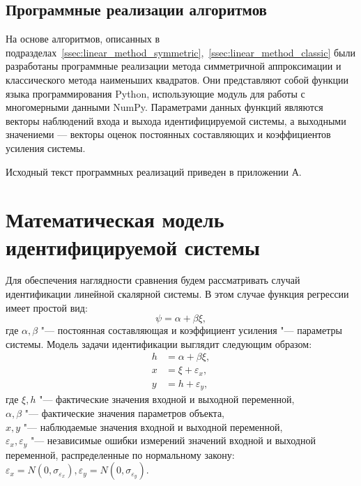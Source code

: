 \vspace{2\baselineskip}
\subsection{Программные реализации алгоритмов}

На основе алгоритмов, описанных в
подразделах~\ref{ssec:linear_method_symmetric},~\ref{ssec:linear_method_classic}
были разработаны программные реализации метода симметричной аппроксимации и
классического метода наименьших квадратов.
Они представляют собой функции языка программирования Python,
использующие модуль для работы с многомерными данными NumPy.
Параметрами данных функций являются векторы наблюдений входа и выхода
идентифицируемой системы, а выходными значениеми ---
векторы оценок постоянных составляющих и коэффициентов усиления системы.

Исходный текст программных реализаций приведен в приложении А.

\section{Математическая модель идентифицируемой системы}

Для обеспечения наглядности сравнения будем рассматривать случай
идентификации линейной скалярной системы.
В этом случае функция регрессии имеет простой вид:
\begin{equation}
  \psi = \alpha + \beta \xi,
  \label{eq:linear_fun_scalar}
\end{equation}
где \( \alpha, \beta \) "--- постоянная составляющая и коэффициент усиления "---
параметры системы. Модель задачи идентификации выглядит следующим образом:
\begin{equation}
  \label{eq:linear_model_scalar}
  \begin{aligned}
  h &= \alpha + \beta \xi, \\
  x &= \xi + \varepsilon_x, \\
  y &= h + \varepsilon_y,
  \end{aligned}
\end{equation}
где \( \xi, h \) "--- фактические значения входной и выходной переменной, \\
\hspace*{6mm} \( \alpha, \beta \) "--- фактические значения параметров объекта, \\
\hspace*{6mm} \( x, y \) "--- наблюдаемые значения входной и выходной переменной, \\
\hspace*{5mm} \( \varepsilon_x, \varepsilon_y \) "--- независимые ошибки измерений значений
входной и выходной переменной, распределенные по нормальному закону:
\(
\varepsilon_x = N(0, \sigma_{\varepsilon_x}),
\varepsilon_y = N(0, \sigma_{\varepsilon_y})
\).

